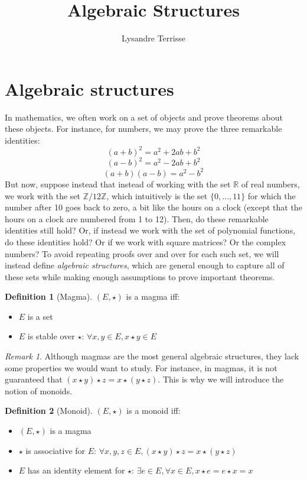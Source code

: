 \documentclass{article}
\title{Algebraic Structures}
\author{Lysandre Terrisse}
\theoremstyle{definition}
\newtheorem{definition}{Definition}[section]
\theoremstyle{remark}
\newtheorem*{remark}{Remark}
\theoremstyle{example}
\begin{document}
\maketitle

\section{Algebraic structures}

In mathematics, we often work on a set of objects and prove theorems about these objects. For instance, for numbers, we may prove the three remarkable identities:
		$$(a + b)^2 = a^2 + 2ab + b^2$$
		$$(a - b)^2 = a^2 - 2ab + b^2$$
		$$(a + b)(a - b) = a^2 - b^2$$
		But now, suppose instead that instead of working with the set $\mathbb{R}$ of real numbers, we work with the set $\mathbb{Z}/12\mathbb{Z}$, which intuitively is the set $\{0, \dots, 11\}$ for which the number after 10 goes back to zero, a bit like the hours on a clock (except that the hours on a clock are numbered from 1 to 12). Then, do these remarkable identities still hold? Or, if instead we work with the set of polynomial functions, do these identities hold? Or if we work with square matrices? Or the complex numbers? To avoid repeating proofs over and over for each such set, we will instead define \textit{algebraic structures}, which are general enough to capture all of these sets while making enough assumptions to prove important theorems.

\begin{definition}[Magma]
		$(E, \star)$ is a magma iff:
		\begin{itemize}
				\item $E$ is a set
				\item $E$ is stable over $\star$: $\forall x, y \in E, x \star y \in E$
		\end{itemize}
\end{definition}

\begin{remark}
		Although magmas are the most general algebraic structures, they lack some properties we would want to study. For instance, in magmas, it is not guaranteed that $(x \star y) \star z = x \star (y \star z)$. This is why we will introduce the notion of monoids.
\end{remark}

\begin{definition}[Monoid]
		$(E, \star)$ is a monoid iff:
		\begin{itemize}
				\item $(E, \star)$ is a magma
				\item $\star$ is associative for $E$: $\forall x, y, z \in E, (x \star y) \star z = x \star (y \star z)$
				\item $E$ has an identity element for $\star$: $\exists e \in E, \forall x \in E, x \star e = e \star x = x$
		\end{itemize}
\end{definition}
\end{document}
